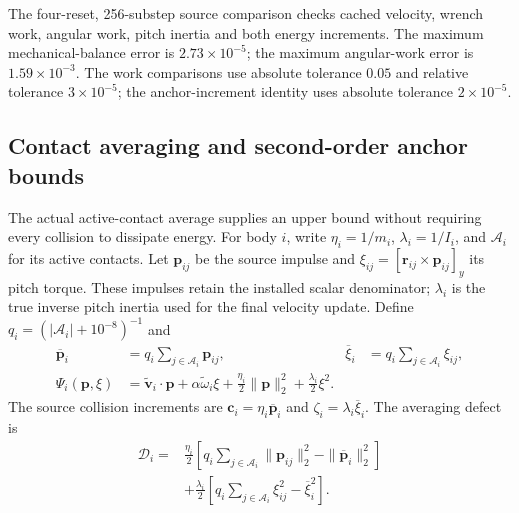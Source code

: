 The four-reset, 256-substep source comparison checks cached velocity, wrench work, angular work, pitch inertia and both energy increments.
The maximum mechanical-balance error is $2.73\times10^{-5}$; the maximum angular-work error is $1.59\times10^{-3}$.
The work comparisons use absolute tolerance $0.05$ and relative tolerance $3\times10^{-5}$; the anchor-increment identity uses absolute tolerance $2\times10^{-5}$.

\subsection{Contact averaging and second-order anchor bounds}
\label{app:energy_bounds}

The actual active-contact average supplies an upper bound without requiring every collision to dissipate energy.
For body $i$, write $\eta_i=1/m_i$, $\lambda_i=1/I_i$, and $\mathcal A_i$ for its active contacts.
Let $\mathbf p_{ij}$ be the source impulse and $\xi_{ij}=[\mathbf r_{ij}\times\mathbf p_{ij}]_y$ its pitch torque.
These impulses retain the installed scalar denominator; $\lambda_i$ is the true inverse pitch inertia used for the final velocity update.
Define $q_i=(|\mathcal A_i|+10^{-8})^{-1}$ and
\begin{align}
 \overline{\mathbf p}_i&=q_i\sum_{j\in\mathcal A_i}\mathbf p_{ij},
 &\overline\xi_i&=q_i\sum_{j\in\mathcal A_i}\xi_{ij},\nonumber\\
 \Psi_i(\mathbf p,\xi)&=\widetilde{\mathbf v}_i\cdot\mathbf p+
   \alpha\widetilde\omega_i\xi+
   \tfrac{\eta_i}{2}\|\mathbf p\|_2^2+\tfrac{\lambda_i}{2}\xi^2.
 \label{eq:individual_contact_energy}
\end{align}
The source collision increments are $\mathbf c_i=\eta_i\overline{\mathbf p}_i$ and $\zeta_i=\lambda_i\overline\xi_i$.
The averaging defect is
\begin{align}
 \mathcal D_i={}&\tfrac{\eta_i}{2}\left[
 q_i\sum_{j\in\mathcal A_i}\|\mathbf p_{ij}\|_2^2-
 \|\overline{\mathbf p}_i\|_2^2\right]\nonumber\\
 &+\tfrac{\lambda_i}{2}\left[
 q_i\sum_{j\in\mathcal A_i}\xi_{ij}^2-\overline\xi_i^2\right].
 \label{eq:contact_average_defect}
\end{align}

